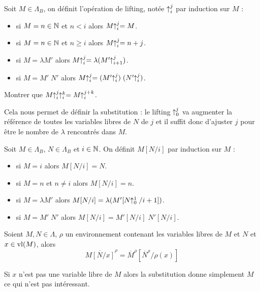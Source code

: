 \begin{defi}[Lifting]
    Soit $M\in\Lambda_B$, on définit l'opération de lifting, notée $\;\!\!\uparrow_i^j$ par induction sur $M$ :
    \begin{itemize}[label=$\bullet$]
        \item si $M = n \in\mathbb{N}$ et $n < i$ alors $M\!\!\uparrow_i^j = M$.
        \item si $M = n\in\mathbb{N}$ et $n\geq i$ alors $M\!\!\uparrow_i^j = n+j$.
        \item si $M = \lambda M'$ alors $M\!\!\uparrow_i^j = \lambda (M'\!\!\uparrow_{i+1}^j)$.
        \item si $M = M'\;N'$ alors $M\!\!\uparrow_i^j = (M'\!\!\uparrow_i^j)\;(N'\!\!\uparrow_i^j)$.
    \end{itemize}
\end{defi}

\begin{exo}
    Montrer que $M\!\!\uparrow_i^j\;\!\!\uparrow_i^k = M\!\!\uparrow_i^{j+k}$. 
\end{exo}

Cela nous permet de définir la substitution : le lifting $\;\!\!\uparrow_0^j$ va augmenter la référence de toutes les variables libres de $N$ de $j$ et il suffit donc d'ajuster $j$ pour être le nombre de $\lambda$ rencontrés dans $M$.

\begin{defi}[Substitution]
    Soit $M\in\Lambda_B$, $N\in\Lambda_B$ et $i\in\mathbb{N}$. On définit $M[N/i]$ par induction sur $M$ :
    \begin{itemize}[label=$\bullet$]
        \item si $M = i$ alors $M[N/i] = N$.
        \item si $M = n$ et $n\neq i$ alors $M[N/i] = n$.
        \item si $M = \lambda M'$ alors $M[N/i] = \lambda (M'[N\!\!\uparrow_0^1/i+1])$.
        \item si $M = M'\;N'$ alors $M[N/i] = M'[N/i]\;N'[N/i]$.
    \end{itemize}
\end{defi}

\begin{them}
    Soient $M,N\in\Lambda$, $\rho$ un environnement contenant les variables libres de $M$ et $N$ et $x\in\mathrm{vl}(M)$, alors $$\overline{M[N/x]}^\rho = \overline M^\rho[\overline N^\rho/\rho(x)]$$
\end{them}

\begin{rmk}
    Si $x$ n'est pas une variable libre de $M$ alors la substitution donne simplement $M$ ce qui n'est pas intéressant.
\end{rmk}

